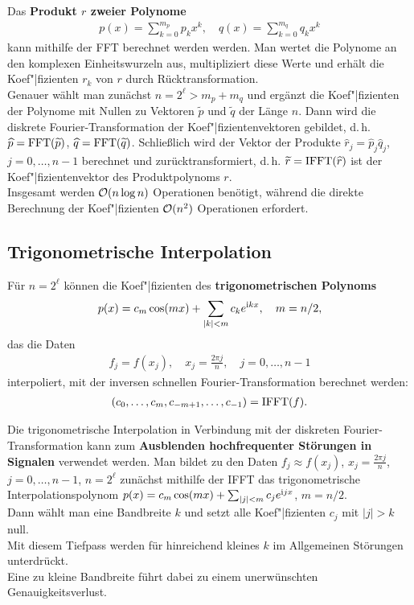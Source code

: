 Das \textbf{Produkt $r$ zweier Polynome}
\begin{align*}
    p(x) = \sum_{k=0}^{m_p} p_k x^k, \quad
    q(x) = \sum_{k=0}^{m_q} q_k x^k
\end{align*}
kann mithilfe der FFT berechnet werden werden.
Man wertet die Polynome an den komplexen Einheitswurzeln aus,
multipliziert diese Werte und erhält die Koef"|fizienten $r_k$ von $r$
durch Rücktransformation. \\
Genauer wählt man zunächst $n = 2^\ell > m_p + m_q$ und ergänzt die
Koef"|fizienten der Polynome mit Nullen zu Vektoren $\widetilde{p}$ und
$\widetilde{q}$ der Länge $n$.
Dann wird die diskrete Fourier-Transformation der Koef"|fizientenvektoren
gebildet, d.\,h. $\widehat{p} = \operatorname{FFT}(\widetilde{p})$,
$\widehat{q} = \operatorname{FFT}(\widetilde{q})$.
Schließlich wird der Vektor der Produkte
$\widehat{r}_j = \widehat{p}_j \widehat{q}_j$, $j = 0, \dotsc, n - 1$
berechnet und zurücktransformiert, d.\,h.
$\widetilde{r} = \operatorname{IFFT}(\widehat{r})$ ist der Koef"|fizientenvektor des
Produktpolynoms $r$. \\
Insgesamt werden $\mathcal{O}(n \log n)$ Operationen benötigt, während die
direkte Berechnung der Koef"|fizienten $\mathcal{O}(n^2)$ Operationen erfordert.

\subsection{%
    Trigonometrische Interpolation%
}

Für $n = 2^\ell$ können die Koef"|fizienten des
\textbf{trigonometrischen Polynoms}
\begin{align*}
    p(x) = c_m \cos(mx) + \sum_{|k| < m} c_k e^{\mathrm{i} k x}, \quad
    m = n/2,
\end{align*}
das die Daten
\begin{align*}
    f_j = f(x_j), \quad
    x_j = \frac{2\pi j}{n}, \quad
    j = 0, \dotsc, n - 1
\end{align*}
interpoliert, mit der inversen schnellen Fourier-Transformation berechnet
werden:
\begin{align*}
    (c_0, \dotsc, c_m, c_{-m+1}, \dotsc, c_{-1}) = \operatorname{IFFT}(f).
\end{align*}

\linie

Die trigonometrische Interpolation in Verbindung mit der diskreten
Fourier-Transformation kann zum
\textbf{Ausblenden hochfrequenter Störungen in Signalen} verwendet werden.
Man bildet zu den Daten $f_j \approx f(x_j)$, $x_j = \frac{2\pi j}{n}$,
$j = 0, \dotsc, n - 1$, $n = 2^\ell$ zunächst mithilfe der IFFT das
trigonometrische Interpolationspolynom
$p(x) = c_m \cos(mx) + \sum_{|j| < m} c_j e^{\mathrm{i} j x}$, $m = n/2$. \\
Dann wählt man eine Bandbreite $k$ und setzt alle Koef"|fizienten $c_j$
mit $|j| > k$ null. \\
Mit diesem Tiefpass werden für hinreichend kleines $k$ im Allgemeinen
Störungen unterdrückt. \\
Eine zu kleine Bandbreite führt dabei zu einem unerwünschten
Genauigkeitsverlust.


